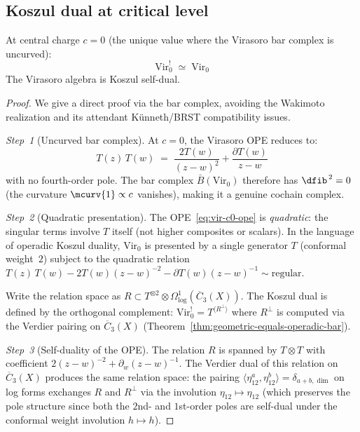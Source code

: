 \subsection{Koszul dual at critical level}

\begin{theorem}[Virasoro self-duality at \texorpdfstring{$c=0$}{c=0}; \ClaimStatusProvedHere]
\label{thm:virasoro-self-duality}
At central charge $c = 0$ (the unique value where the Virasoro bar complex
is uncurved):
\begin{equation}
\mathrm{Vir}_0^! \;\simeq\; \mathrm{Vir}_0
\end{equation}
The Virasoro algebra is Koszul self-dual.
\end{theorem}

\begin{proof}
We give a direct proof via the bar complex, avoiding the Wakimoto
realization and its attendant K\"unneth/BRST compatibility issues.

\emph{Step~1} (Uncurved bar complex).
At $c = 0$, the Virasoro OPE reduces to:
\begin{equation}\label{eq:vir-c0-ope}
T(z)\,T(w) \;=\; \frac{2T(w)}{(z-w)^2} + \frac{\partial T(w)}{z-w}
\end{equation}
with no fourth-order pole.  The bar complex
$\bar{B}(\mathrm{Vir}_0)$ therefore has $\dfib^{\,2} = 0$ (the curvature
$\mcurv{1} \propto c$ vanishes), making it a genuine cochain complex.

\emph{Step~2} (Quadratic presentation).
The OPE~\eqref{eq:vir-c0-ope} is \emph{quadratic}: the singular terms
involve $T$ itself (not higher composites or scalars).
In the language of operadic Koszul duality, $\mathrm{Vir}_0$ is presented
by a single generator $T$ (conformal weight~$2$) subject to the quadratic
relation $T(z)\,T(w) - 2T(w)(z-w)^{-2} - \partial T(w)(z-w)^{-1}
\sim \text{regular}$.

Write the relation space as $R \subset T^{\otimes 2} \otimes
\Omega^1_{\log}(\overline{C}_3(X))$.  The Koszul dual is defined by the
orthogonal complement:
$\mathrm{Vir}_0^! = T^{\langle R^\perp \rangle}$
where $R^\perp$ is computed via the Verdier pairing on
$\overline{C}_3(X)$ (Theorem~\ref{thm:geometric-equals-operadic-bar}).

\emph{Step~3} (Self-duality of the OPE).
The relation $R$ is spanned by $T \otimes T$ with coefficient
$2(z-w)^{-2} + \partial_w(z-w)^{-1}$.  The Verdier dual of this relation
on $\overline{C}_3(X)$ produces the same relation space:
the pairing $\langle \eta_{12}^a, \eta_{12}^b \rangle =
\delta_{a+b, \dim}$ on log forms exchanges $R$ and $R^\perp$ via the
involution $\eta_{12} \mapsto \eta_{12}$ (which preserves the pole
structure since both the $2$nd- and $1$st-order poles are self-dual under
the conformal weight involution $h \mapsto h$).


\end{proof}
